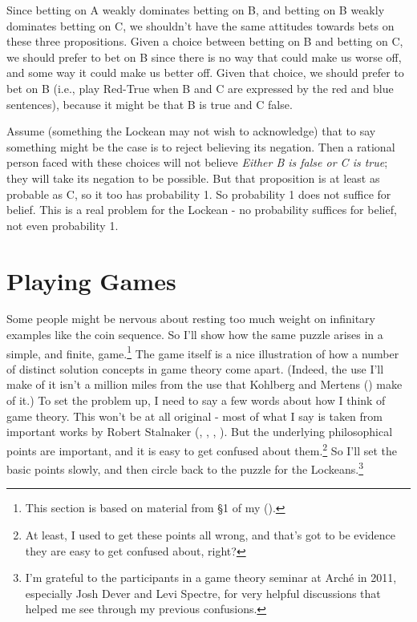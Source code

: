 \documentclass[
  12pt,
  letterpaper,
]{scrbook}
\begin{document}
Since betting on A weakly dominates betting on B, and betting on B
weakly dominates betting on C, we shouldn't have the same attitudes
towards bets on these three propositions. Given a choice between betting
on B and betting on C, we should prefer to bet on B since there is no
way that could make us worse off, and some way it could make us better
off. Given that choice, we should prefer to bet on B (i.e., play
Red-True when B and C are expressed by the red and blue sentences),
because it might be that B is true and C false.

Assume (something the Lockean may not wish to acknowledge) that to say
something might be the case is to reject believing its negation. Then a
rational person faced with these choices will not believe \emph{Either B
is false or C is true}; they will take its negation to be possible. But
that proposition is at least as probable as C, so it too has probability
1. So probability 1 does not suffice for belief. This is a real problem
for the Lockean - no probability suffices for belief, not even
probability 1.

\section{Playing Games}\label{sec-lockegames}

Some people might be nervous about resting too much weight on infinitary
examples like the coin sequence. So I'll show how the same puzzle arises
in a simple, and finite, game.\footnote{This section is based on
  material from §1 of my ().} The
game itself is a nice illustration of how a number of distinct solution
concepts in game theory come apart. (Indeed, the use I'll make of it
isn't a million miles from the use that Kohlberg and Mertens
() make of it.) To set the
problem up, I need to say a few words about how I think of game theory.
This won't be at all original - most of what I say is taken from
important works by Robert Stalnaker (,
, ,
). But the underlying philosophical
points are important, and it is easy to get confused about
them.\footnote{At least, I used to get these points all wrong, and
  that's got to be evidence they are easy to get confused about, right?}
So I'll set the basic points slowly, and then circle back to the puzzle
for the Lockeans.\footnote{I'm grateful to the participants in a game
  theory seminar at Arché in 2011, especially Josh Dever and Levi
  Spectre, for very helpful discussions that helped me see through my
  previous confusions.}
\end{document}

